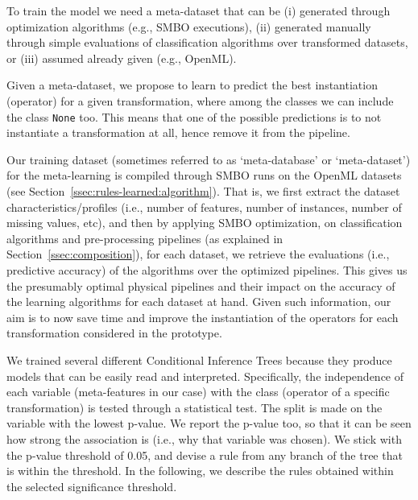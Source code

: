 To train the model we need a meta-dataset that can be  (i) generated through optimization algorithms (e.g., SMBO executions), (ii) generated manually through simple evaluations of classification algorithms over transformed datasets, or (iii) assumed already given (e.g., OpenML). 

Given a meta-dataset, we propose to learn to predict the best instantiation (operator) for a given transformation, where among the classes we can include the class \texttt{None} too. This means that one of the possible predictions is to not instantiate a transformation at all, hence remove it from the pipeline.

\begin{example}
Our training dataset (sometimes referred to as `meta-database' or `meta-dataset') for the meta-learning is compiled through SMBO runs on the OpenML datasets (see Section~\ref{ssec:rules-learned:algorithm}). That is, we first extract the dataset characteristics/profiles (i.e., number of features, number of instances, number of missing values, etc), and then by applying SMBO optimization, on classification algorithms and pre-processing pipelines (as explained in Section~\ref{ssec:composition}), for each dataset, we retrieve the evaluations (i.e., predictive accuracy) of the algorithms over the optimized pipelines. This gives us the presumably optimal physical pipelines and their impact on the accuracy of the learning algorithms for each dataset at hand. Given such information, our aim is to now save time and improve the instantiation of the operators for each transformation considered in the prototype. 

We trained several different Conditional Inference Trees \cite{ctree} because they produce models that can be easily read and interpreted.
Specifically, the independence of each variable (meta-features in our case) with the class (operator of a specific transformation) is tested through a statistical test. 
The split is made on the variable with the lowest p-value. 
We report the p-value too, so that it can be seen how strong the association is (i.e., why that variable was chosen).
We stick with the p-value threshold of 0.05, and devise a rule from any branch of the tree that is within the threshold. In the following, we describe the rules obtained within the selected significance threshold.


\end{example}
